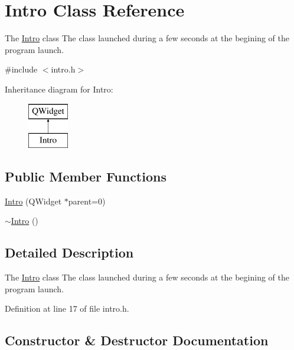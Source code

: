 \hypertarget{class_intro}{}\section{Intro Class Reference}
\label{class_intro}


The \hyperlink{class_intro}{Intro} class The class launched during a few seconds at the begining of the program launch.  




{\ttfamily \#include $<$intro.\+h$>$}

Inheritance diagram for Intro\+:\begin{figure}[H]
\begin{center}
\leavevmode
\includegraphics[height=2.000000cm]{class_intro}
\end{center}
\end{figure}
\subsection*{Public Member Functions}
\begin{DoxyCompactItemize}
\item 
\hyperlink{class_intro_a82415c2693757f51e4e93ccc8abd720e}{Intro} (Q\+Widget $\ast$parent=0)
\item 
\hyperlink{class_intro_a024067dadaf97daca3bfeb0f22e9c183}{$\sim$\+Intro} ()
\end{DoxyCompactItemize}


\subsection{Detailed Description}
The \hyperlink{class_intro}{Intro} class The class launched during a few seconds at the begining of the program launch. 

Definition at line 17 of file intro.\+h.



\subsection{Constructor \& Destructor Documentation}
\hypertarget{class_intro_a82415c2693757f51e4e93ccc8abd720e}{}\label{class_intro_a82415c2693757f51e4e93ccc8abd720e} 
